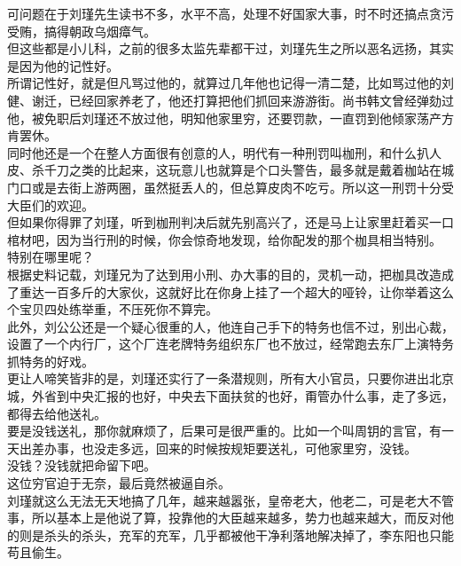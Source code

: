 \begin{multicols}{\theparacolNo}
可问题在于刘瑾先生读书不多，水平不高，处理不好国家大事，时不时还搞点贪污受贿，搞得朝政乌烟瘴气。\\

但这些都是小儿科，之前的很多太监先辈都干过，刘瑾先生之所以恶名远扬，其实是因为他的记性好。\\

所谓记性好，就是但凡骂过他的，就算过几年他也记得一清二楚，比如骂过他的刘健、谢迁，已经回家养老了，他还打算把他们抓回来游游街。尚书韩文曾经弹劾过他，被免职后刘瑾还不放过他，明知他家里穷，还要罚款，一直罚到他倾家荡产方肯罢休。\\

同时他还是一个在整人方面很有创意的人，明代有一种刑罚叫枷刑，和什么扒人皮、杀千刀之类的比起来，这玩意儿也就算是个口头警告，最多就是戴着枷站在城门口或是去街上游两圈，虽然挺丢人的，但总算皮肉不吃亏。所以这一刑罚十分受大臣们的欢迎。\\

但如果你得罪了刘瑾，听到枷刑判决后就先别高兴了，还是马上让家里赶着买一口棺材吧，因为当行刑的时候，你会惊奇地发现，给你配发的那个枷具相当特别。\\

特别在哪里呢？\\

根据史料记载，刘瑾兄为了达到用小刑、办大事的目的，灵机一动，把枷具改造成了重达一百多斤的大家伙，这就好比在你身上挂了一个超大的哑铃，让你举着这么个宝贝四处练举重，不压死你不算完。\\

此外，刘公公还是一个疑心很重的人，他连自己手下的特务也信不过，别出心裁，设置了一个内行厂，这个厂连老牌特务组织东厂也不放过，经常跑去东厂上演特务抓特务的好戏。\\

更让人啼笑皆非的是，刘瑾还实行了一条潜规则，所有大小官员，只要你进出北京城，外省到中央汇报的也好，中央去下面扶贫的也好，甭管办什么事，走了多远，都得去给他送礼。\\

要是没钱送礼，那你就麻烦了，后果可是很严重的。比如一个叫周钥的言官，有一天出差办事，也没走多远，回来的时候按规矩要送礼，可他家里穷，没钱。\\

没钱？没钱就把命留下吧。\\

这位穷官迫于无奈，最后竟然被逼自杀。\\

刘瑾就这么无法无天地搞了几年，越来越嚣张，皇帝老大，他老二，可是老大不管事，所以基本上是他说了算，投靠他的大臣越来越多，势力也越来越大，而反对他的则是杀头的杀头，充军的充军，几乎都被他干净利落地解决掉了，李东阳也只能苟且偷生。\\


\end{multicols}
